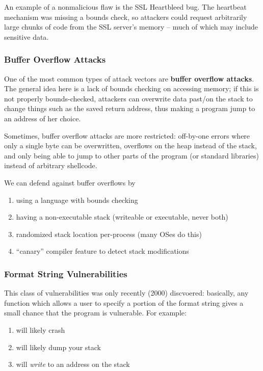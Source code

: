 \documentclass[12pt]{article}
\begin{document}
An example of a nonmalicious flaw is the SSL Heartbleed bug. The heartbeat mechanism was missing a bounds check, so attackers could request arbitrarily large chunks of code from the SSL server's memory -- much of which may include sensitive data.

\subsubsection{Buffer Overflow Attacks}
One of the most common types of attack vectors are {\bf buffer overflow attacks}. The general idea here is a lack of bounds checking on accessing memory; if this is not properly bounds-checked, attackers can overwrite data past/on the stack to change things such as the saved return address, thus making a program jump to an address of her choice.

Sometimes, buffer overflow attacks are more restricted: off-by-one errors where only a single byte can be overwritten, overflows on the heap instead of the stack, and only being able to jump to other parts of the program (or standard libraries) instead of arbitrary shellcode.

We can defend against buffer overflows by
\begin{enumerate}
\item using a language with bounds checking
\item having a non-executable stack (writeable or executable, never both)
\item randomized stack location per-process (many OSes do this)
\item ``canary'' compiler feature to detect stack modifications
\end{enumerate}

\subsubsection{Format String Vulnerabilities}
This class of vulnerabilities was only recently (2000) discvoered: basically, any function which allows a user to specify a portion of the format string gives a small chance that the program is vulnerable. For example:

\begin{enumerate}
\item {} will likely crash
\item {} will likely dump your stack
\item {} will {\it write} to an address on the stack
\end{enumerate}
\end{document}
